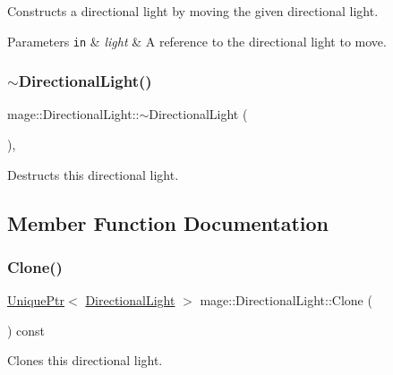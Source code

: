 Constructs a directional light by moving the given directional light.


\begin{DoxyParams}[1]{Parameters}
\mbox{\tt in}  & {\em light} & A reference to the directional light to move. \\
\hline
\end{DoxyParams}
\hypertarget{classmage_1_1_directional_light_a967d33c11a1477c01ce4c9720337caeb}{}\label{classmage_1_1_directional_light_a967d33c11a1477c01ce4c9720337caeb} 
\subsubsection{\texorpdfstring{$\sim$\+Directional\+Light()}{~DirectionalLight()}}
{\footnotesize\ttfamily mage\+::\+Directional\+Light\+::$\sim$\+Directional\+Light (\begin{DoxyParamCaption}{ }\end{DoxyParamCaption})\hspace{0.3cm}{\ttfamily [virtual]}, {\ttfamily [default]}}

Destructs this directional light. 

\subsection{Member Function Documentation}
\hypertarget{classmage_1_1_directional_light_a779c49e066215cff9f80ed40048dfc62}{}\label{classmage_1_1_directional_light_a779c49e066215cff9f80ed40048dfc62} 
\subsubsection{\texorpdfstring{Clone()}{Clone()}}
{\footnotesize\ttfamily \hyperlink{namespacemage_a3316d7143a973e37adf1110f2e80ca31}{Unique\+Ptr}$<$ \hyperlink{classmage_1_1_directional_light}{Directional\+Light} $>$ mage\+::\+Directional\+Light\+::\+Clone (\begin{DoxyParamCaption}{ }\end{DoxyParamCaption}) const}

Clones this directional light.

